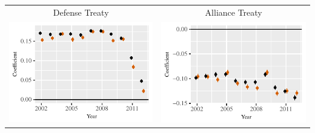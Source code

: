 \documentclass[reqno,onecolumn,letterpaper,12pt]{article}
\begin{document}
\begin{longtable}{c@{\hskip -.4cm}c}
\pagebreak
Defense Treaty &
Alliance Treaty\\
\includegraphics[height=.2\textheight, clip=true, trim=0cm .5cm 0cm .1cm]{draft_figures/rl_plots/Defense.pdf}   &
\includegraphics[height=.2\textheight, clip=true, trim=.5cm .5cm 0cm .1cm]{draft_figures/rl_plots/Alliance.pdf}\\

%
%


\end{longtable}
\end{document}
